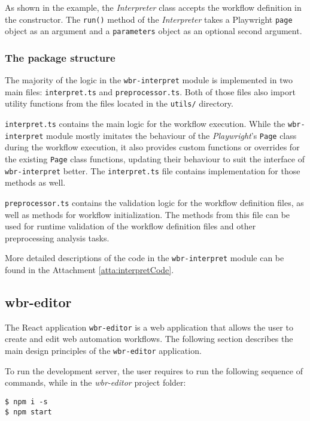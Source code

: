 As shown in the example, the \textit{Interpreter} class accepts the workflow definition in the constructor. The \texttt{run()} method of the \textit{Interpreter} takes a Playwright \texttt{page} object as an argument and a \texttt{parameters} object as an optional second argument.

\subsubsection{The package structure}

The majority of the logic in the \texttt{wbr-interpret} module is implemented in two main files: \texttt{interpret.ts} and \texttt{preprocessor.ts}.
Both of those files also import utility functions from the files located in the \texttt{utils/} directory.

\texttt{interpret.ts} contains the main logic for the workflow execution. 
While the \texttt{wbr-interpret} module mostly imitates the behaviour of the \textit{Playwright}'s \texttt{Page} class during the workflow execution,
it also provides custom functions or overrides for the existing \texttt{Page} class functions, updating their behaviour to suit the interface of \texttt{wbr-interpret} better.
The \texttt{interpret.ts} file contains implementation for those methods as well. 

\texttt{preprocessor.ts} contains the validation logic for the workflow definition files, as well as methods for workflow initialization.
The methods from this file can be used for runtime validation of the workflow definition files
and other preprocessing analysis tasks.

More detailed descriptions of the code in the \texttt{wbr-interpret} module can be found in the Attachment \ref{atta:interpretCode}.

\subsection{wbr-editor}

The React application \texttt{wbr-editor} is a web application that allows the user to create and edit web automation workflows.
The following section describes the main design principles of the \texttt{wbr-editor} application.

To run the development server, the user requires to run the following sequence of commands, while in the \textit{wbr-editor} project folder:
\begin{verbatim}
$ npm i -s
$ npm start
\end{verbatim}

